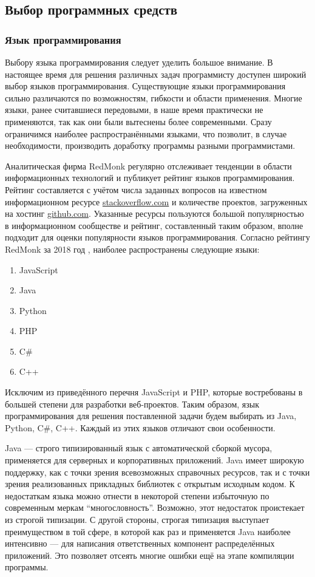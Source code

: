 \documentclass[12pt]{diploma}
\begin{document}
	\subsection{Выбор программных средств}
	
	\subsubsection{Язык программирования} 
	Выбору языка программирования следует уделить большое внимание. В настоящее время для решения различных задач программисту доступен широкий выбор языков программирования. Существующие языки программирования
	сильно различаются по возможностям, гибкости и области применения. Многие языки, ранее считавшиеся передовыми, в наше время практически не применяются, так как они были вытеснены более современными. Сразу ограничимся наиболее распространёнными языками, что позволит, в случае необходимости, производить доработку программы разными программистами. 
	
	Аналитическая фирма RedMonk регулярно отслеживает тенденции в области информационных технологий и публикует рейтинг языков программирования. Рейтинг составляется с учётом числа заданных вопросов на известном информационном ресурсе \href{https://stackoverflow.com/}{stackoverflow.com} и количестве проектов, загруженных на хостинг \href{https://github.com/}{github.com}. Указанные ресурсы пользуются большой популярностью в информационном сообществе и рейтинг, составленный таким образом, вполне подходит для оценки популярности языков программирования. Согласно рейтингу RedMonk за 2018 год \cite{RedMonk}, наиболее распространены следующие языки:
	\begin{enumerate}
		\item JavaScript
		\item Java
		\item Python
		\item PHP
		\item C\#
		\item C++
	\end{enumerate}
	
	Исключим из приведённого перечня JavaScript и PHP, которые востребованы в большей степени для разработки веб-проектов. Таким образом, язык программирования для решения поставленной задачи будем выбирать из Java, Python, C\#, C++. Каждый из этих языков отличают свои особенности. 
	
	Java --- строго типизированный язык с автоматической сборкой мусора, применяется для серверных и корпоративных приложений. Java имеет широкую поддержку, как с точки зрения всевозможных справочных ресурсов, так и с точки зрения реализованных прикладных библиотек с открытым исходным кодом. К недостаткам языка можно отнести в некоторой степени избыточную по современным меркам ``многословность''. Возможно, этот недостаток проистекает из строгой типизации. С другой стороны, строгая типизация выступает преимуществом в той сфере, в которой как раз и применяется Java наиболее интенсивно --- для написания ответственных компонент распределённых приложений. Это позволяет отсеять многие ошибки ещё на этапе компиляции программы. 
	
\end{document}
